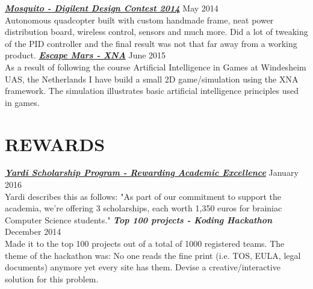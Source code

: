 \documentclass[line,margin]{res}
\begin{document}
\begin{resume}
\vspace{0.2cm}
\newline
{\color{headings}\large \sl \textbf{\href{https://github.com/robikovacs/mosquito-quadcopter}{Mosquito - Digilent Design Contest 2014}}} {\scriptsize May 2014} \\
Autonomous quadcopter built with custom handmade frame, neat power distribution board, wireless control, sensors and much more. Did a lot of tweaking of the PID controller and the final result was not that far away from a working product.
\vspace{0.2cm}
\newline
{\color{headings}\large \sl \textbf{\href{https://github.com/AlexBondor/Escape-Mars-XNA}{Escape Mars - XNA}}} {\scriptsize June 2015} \\
As a result of following the course Artificial Intelligence in Games at Windesheim UAS, the Netherlands I have build a small 2D game/simulation using the XNA framework. The simulation illustrates basic artificial intelligence principles used in games.

\section{\color{section} REWARDS} 
\justify
{\color{headings}\large \sl \textbf{\href{https://github.com/AlexBondor/Escape-Mars-XNA}{Yardi Scholarship Program - Rewarding Academic Excellence}}} {\scriptsize January 2016} \\
Yardi describes this as follows: "As part of our commitment to support the academia, we're offering 3 scholarships, each worth 1,350 euros for brainiac Computer Science students."
\vspace{0.2cm}
\newline
{\color{headings}\large \sl \textbf{Top 100 projects - Koding Hackathon}} {\scriptsize December 2014} \\
Made it to the top 100 projects out of a total of 1000 registered teams. The theme of the hackathon was: No one reads the fine print (i.e. TOS, EULA, legal documents) anymore yet every site has them. Devise a creative/interactive solution for this problem.

\newpage


\end{resume}
\end{document}
